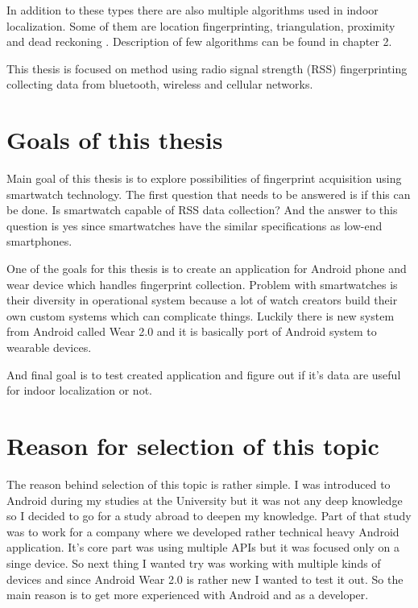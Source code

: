In addition to these types there are also multiple algorithms used in indoor localization. Some of them are location fingerprinting, triangulation, proximity and dead reckoning \cite{AaPLocalisation}. Description of few algorithms can be found in chapter 2.

This thesis is focused on method using radio signal strength (RSS) fingerprinting collecting data from bluetooth, wireless and cellular networks.

\section{Goals of this thesis}\label{sec:GoalsOfThisThesis}
Main goal of this thesis is to explore possibilities of fingerprint acquisition using smartwatch technology. The first question that needs to be answered is if this can be done. Is smartwatch capable of RSS data collection? And the answer to this question is yes since smartwatches have the similar specifications as low-end smartphones. 

One of the goals for this thesis is to create an application for Android phone and wear device which handles fingerprint collection. Problem with smartwatches is their diversity in operational system because a lot of watch creators build their own custom systems which can complicate things. Luckily there is new system from Android called Wear 2.0 and it is basically port of Android system to wearable devices. 

And final goal is to test created application and figure out if it's data are useful for indoor localization or not.

\section{Reason for selection of this topic}\label{sec:ReasonForSelectionOfThisTopic}
The reason behind selection of this topic is rather simple. I was introduced to Android during my studies at the University but it was not any deep knowledge so I decided to go for a study abroad to deepen my knowledge. Part of that study was to work for a company where we developed rather technical heavy Android application. It's core part was using multiple APIs but it was focused only on a singe device. So next thing I wanted try was working with multiple kinds of devices and since Android Wear 2.0 is rather new I wanted to test it out. So the main reason is to get more experienced with Android and as a developer.